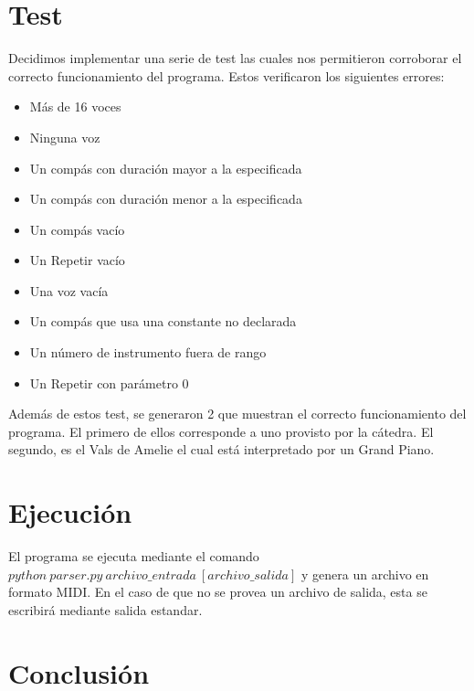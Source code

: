 \documentclass[a4paper, 10pt, twoside]{article}
\begin{document}
\section{Test}
Decidimos implementar una serie de test las cuales nos permitieron corroborar el correcto funcionamiento del programa. Estos verificaron los siguientes errores:

\begin{itemize}
\item Más de 16 voces
\item Ninguna voz
\item Un compás con duración mayor a la especificada
\item Un compás con duración menor a la especificada
\item Un compás vacío 
\item Un Repetir vacío
\item Una voz vacía 
\item Un compás que usa una constante no declarada
\item Un número de instrumento fuera de rango
\item Un Repetir con parámetro 0

\end{itemize}
Además de estos test, se generaron 2 que muestran el correcto funcionamiento del programa. El primero de ellos corresponde a uno provisto por la cátedra. El segundo, es el Vals de Amelie el cual está interpretado por un Grand Piano.
\newpage


\section{Ejecución}
El programa se ejecuta mediante el comando $python\ parser.py\ archivo\_entrada\ [archivo\_salida]$ y genera un archivo en formato MIDI. En el caso de que no se provea un archivo de salida, esta se escribirá mediante salida estandar. 
\newpage


\section{Conclusión}
\end{document}

